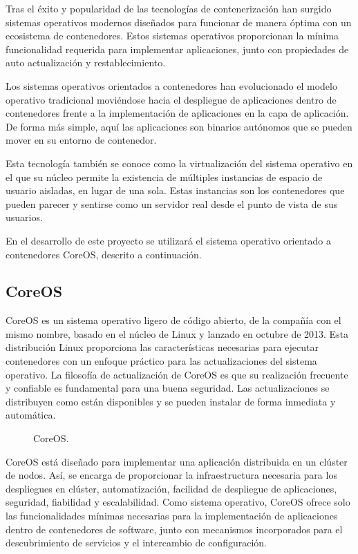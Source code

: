 Tras el éxito y popularidad de las tecnologías de contenerización han surgido sistemas operativos modernos diseñados para funcionar de manera óptima con un ecosistema de contenedores. Estos sistemas operativos proporcionan la mínima funcionalidad requerida para implementar aplicaciones, junto con propiedades de auto actualización y restablecimiento.

Los sistemas operativos orientados a contenedores han evolucionado el modelo operativo tradicional moviéndose hacia el despliegue de aplicaciones dentro de contenedores frente a la implementación de aplicaciones en la capa de aplicación. De forma más simple, aquí las aplicaciones son binarios autónomos que se pueden mover en su entorno de contenedor.

Esta tecnología también se conoce como la virtualización del sistema operativo en el que su núcleo permite la existencia de múltiples instancias de espacio de usuario aisladas, en lugar de una sola. Estas instancias son los contenedores que pueden parecer y sentirse como un servidor real desde el punto de vista de sus usuarios.

En el desarrollo de este proyecto se utilizará el sistema operativo orientado a contenedores CoreOS, descrito a continuación.

\subsection{CoreOS}

CoreOS es un sistema operativo ligero de código abierto, de la compañía con el mismo nombre, basado en el núcleo de Linux y lanzado en octubre de 2013. Esta distribución Linux proporciona las características necesarias para ejecutar contenedores con un enfoque práctico para las actualizaciones del sistema operativo. La filosofía de actualización de CoreOS es que su realización frecuente y confiable es fundamental para una buena seguridad. Las actualizaciones se distribuyen como están disponibles y se pueden instalar de forma inmediata y automática.  

\begin{figure}[H]
\caption{CoreOS.\label{fig:figure_placement_example}}
\end{figure}

CoreOS está diseñado para implementar una aplicación distribuida en un clúster de nodos. Así, se encarga de proporcionar la infraestructura necesaria para los despliegues en clúster, automatización, facilidad de despliegue de aplicaciones, seguridad, fiabilidad y escalabilidad. Como sistema operativo, CoreOS ofrece solo las funcionalidades mínimas necesarias para la implementación de aplicaciones dentro de contenedores de software, junto con mecanismos incorporados para el descubrimiento de servicios y el intercambio de configuración.

